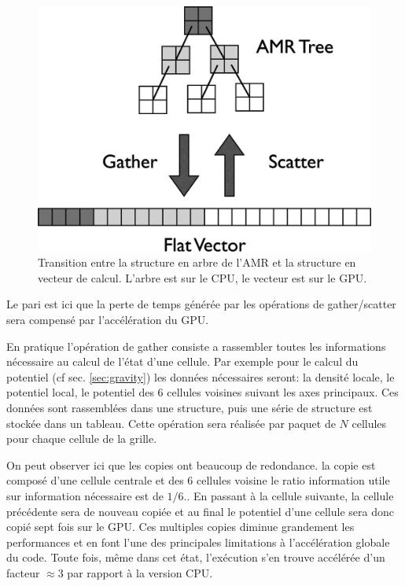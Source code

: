 \begin{figure}[bth]
        \includegraphics[width=.95\linewidth]{img/02/gatherscatter.jpg} 
        \caption[Passage AMR / vecteur]{Transition entre la structure en arbre de l'AMR et la structure en vecteur de calcul.
        L'arbre est sur le CPU, le vecteur est sur le GPU.
 		\label{fig:gatherscatter}
 		}
\end{figure}

Le pari est ici que la perte de temps générée par les opérations de gather/scatter sera compensé par l'accélération du GPU.

En pratique l'opération de gather consiste a rassembler toutes les informations nécessaire au calcul de l'état d'une cellule.
Par exemple pour le calcul du potentiel (cf sec. \ref{sec:gravity}) les données nécessaires seront: la densité locale, le potentiel local, le potentiel des 6 cellules voisines suivant les axes principaux.
Ces données sont rassemblées dans une structure, puis une série de structure est stockée dans un tableau.
Cette opération sera réalisée par paquet de $N$ cellules pour chaque cellule de la grille.

On peut observer ici que les copies ont beaucoup de redondance.
la copie est composé d'une cellule centrale et des 6 cellules voisine le ratio information utile sur information nécessaire est de $1/6$..
En passant à la cellule suivante, la cellule précédente sera de nouveau copiée et au final le potentiel d'une cellule sera donc copié sept fois sur le GPU.
Ces multiples copies diminue grandement les performances et en font l'une des principales limitations à l'accélération globale du code.
Toute fois, même dans cet état, l'exécution s'en trouve accélérée d'un facteur $\approx 3$ par rapport à la version CPU.


